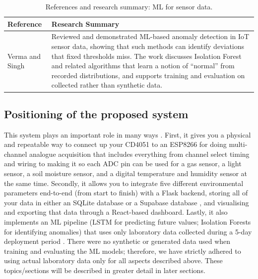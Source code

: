 \documentclass[journal,onecolumn]{IEEEtran}
\begin{document}
\begin{table}[h]
\centering
\caption{References and research summary: ML for sensor data.}
\label{tab:lit-ml}
\small
\begin{tabular}{|p{}|p{}|}
\hline
\textbf{Reference} & \textbf{Research Summary} \\
\hline
Verma and Singh \cite{mlanomaly2022} & Reviewed and demonstrated ML-based anomaly detection in IoT sensor data, showing that such methods can identify deviations that fixed thresholds miss. The work discusses Isolation Forest and related algorithms that learn a notion of ``normal'' from recorded distributions, and supports training and evaluation on collected rather than synthetic data. \\
\hline
\end{tabular}
\end{table}

\subsection{Positioning of the proposed system}
This system plays an important role in many ways \cite{modularsensors2022,labmonitoring2020}. First, it gives you a physical and repeatable way to connect up your CD4051 to an ESP8266 for doing multi-channel analogue acquisition that includes everything from channel select timing and wiring to making it so each ADC pin can be used for a gas sensor, a light sensor, a soil moisture sensor, and a digital temperature and humidity sensor at the same time. Secondly, it allows you to integrate five different environmental parameters end-to-end (from start to finish) with a Flask backend, storing all of your data in either an SQLite database or a Supabase database \cite{sqlite2017}, and visualising and exporting that data through a React-based dashboard. Lastly, it also implements an ML pipeline (LSTM for predicting future values; Isolation Forests for identifying anomalies) that uses only laboratory data collected during a 5-day deployment period \cite{mlanomaly2022}. There were no synthetic or generated data used when training and evaluating the ML models; therefore, we have strictly adhered to using actual laboratory data only for all aspects described above. These topics/sections will be described in greater detail in later sections.
\end{document}
